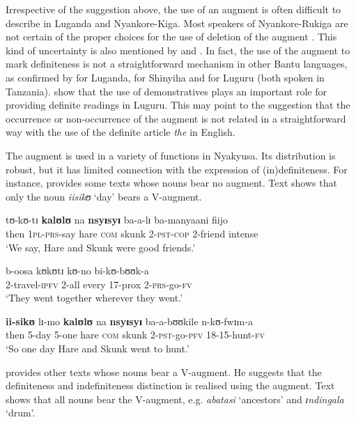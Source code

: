 \documentclass[output=paper]{langscibook}
\begin{document}
Irrespective of the suggestion above, the use of an augment is often difficult to describe in Luganda and Nyankore-Kiga. Most speakers of Nyankore-Rukiga are not certain of the proper choices for the use of deletion of the augment \citep[183--184]{Asiimwe2014}. This kind of uncertainty is also mentioned by \citet{HymanKatamba1993} and \citet{Goodness2013}. In fact, the use of the augment to mark definiteness is not a straightforward mechanism in other Bantu languages, as confirmed by \citet{HymanKatamba1993} for Luganda, \citet{Goodness2013} for Shinyiha and \citet{PetzellKühl2017} for Luguru (both spoken in Tanzania). \citet{PetzellKühl2017} show that the use of demonstratives plays an important role for providing definite readings in Luguru. This may point to the suggestion that the occurrence or non-occurrence of the augment is not related in a straightforward way with the use of the definite article \textit{the} in English. 

The augment is used in a variety of functions in Nyakyusa. Its distribution is robust, but it has limited connection with the expression of (in)definiteness. For instance, \citet[343]{Persohn2017} provides some texts whose nouns bear no augment. Text  shows that only the noun \textit{iisikʊ} ‘day’ bears a V-aug\-ment.   

\ea%
    \label{ex:lusekelo:14}
    \ea {}  {tʊ-kʊ-tɪ}  \textbf{kalʊlʊ}  {na}  \textbf{nsyɪsyɪ}  {ba-a-lɪ}  {ba-manyaani}  {fiijo}\\
  then  1\textsc{pl}-\textsc{prs}-say  hare  \textsc{com}  skunk  2-\textsc{pst}-\textsc{cop}  2-friend  intense\\
  \glt ‘We say, Hare and Skunk were good friends.’

  \ex {}  {b-oosa}  {kʊkʊtɪ}  {kʊ-no}  {bi-kʊ-bʊʊk-a}\\
  2-travel-\textsc{ipfv}  2-all  every  17-prox  2-\textsc{prs}-go-\textsc{fv}\\
  \glt ‘They went together wherever they went.’

  \ex {}  \textbf{ii-sikʊ}  {lɪ-mo}  \textbf{kalʊlʊ}   {na}  \textbf{nsyɪsyɪ}    {ba-a-bʊʊkile}   {n-kʊ-fwɪm-a} \\
    then  5-day  5-one  hare   \textsc{com}  skunk    2-\textsc{pst}-{go}{}-\textsc{pfv}  18-15-hunt-\textsc{fv}\\
    \glt ‘So one day Hare and Skunk went to hunt.’
    \glt \citep[343]{Persohn2017}
\z
\z

\citet[352]{Persohn2017} provides other texts whose nouns bear a V-aug\-ment. He suggests that the definiteness and indefiniteness distinction is realised using the augment. Text  shows that all nouns bear the V-aug\-ment, e.g. \textit{abatasi} ‘ancestors’ and \textit{ɪndingala} ‘drum’. 
\end{document}
